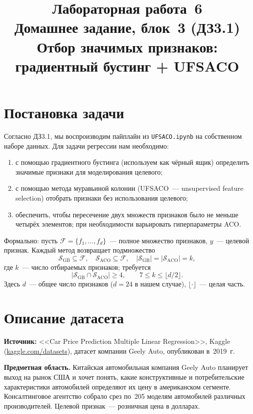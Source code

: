 \documentclass[12pt,a4paper]{article}
\title{Лабораторная работа \No\,6 \\ Домашнее задание, блок \No\,3 (ДЗ3.1) \\
\large Отбор значимых признаков: градиентный бустинг + UFSACO}
\author{}
\date{}
\begin{document}
\maketitle

\section{Постановка задачи}

Согласно ДЗ3.1, мы воспроизводим пайплайн из \texttt{UFSACO.ipynb} на
собственном наборе данных. Для задачи регрессии нам необходимо:
\begin{enumerate}
  \item с помощью градиентного бустинга (используем как чёрный ящик)
        определить значимые признаки для моделирования целевого;
  \item с помощью метода муравьиной колонии (UFSACO~--- unsupervised
        feature selection) отобрать признаки без использования
        целевого;
  \item обеспечить, чтобы пересечение двух множеств признаков было не
        меньше четырёх элементов; при необходимости варьировать
        гиперпараметры ACO.
\end{enumerate}

Формально: пусть $\mathcal{F} = \{f_1, \dots, f_d\}$~--- полное множество
признаков, $y$~--- целевой признак. Каждый метод возвращает
подмножество
\[
  \mathcal{S}_{\text{GB}} \subseteq \mathcal{F}, \quad
  \mathcal{S}_{\text{ACO}} \subseteq \mathcal{F}, \quad
  |\mathcal{S}_{\text{GB}}| = |\mathcal{S}_{\text{ACO}}| = k,
\]
где $k$~--- число отбираемых признаков; требуется
\[
  |\mathcal{S}_{\text{GB}} \cap \mathcal{S}_{\text{ACO}}| \geq 4,
  \qquad 7 \leq k \leq \lfloor d/2 \rfloor.
\]
Здесь $d$~--- общее число признаков ($d=24$ в нашем случае),
$\lfloor \cdot \rfloor$~--- целая часть.

\section{Описание датасета}

\textbf{Источник:} <<Car Price Prediction Multiple Linear Regression>>,
Kaggle (\href{https://www.kaggle.com/datasets}{kaggle.com/datasets}),
датасет компании Geely Auto, опубликован в~2019~г.

\textbf{Предметная область.} Китайская автомобильная компания Geely
Auto планирует выход на рынок США и хочет понять, какие конструктивные
и потребительские характеристики автомобилей определяют их цену в
американском сегменте. Консалтинговое агентство собрало срез по~205
моделям автомобилей различных производителей. Целевой признак~---
розничная цена в долларах.
\end{document}
